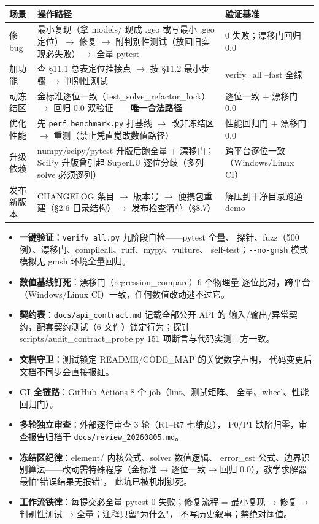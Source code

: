 \documentclass[12pt,a4paper]{ctexart}
\newcommand{\fem}{\Verb}
\begin{document}
\begin{longtable}{p{2.6cm}p{7.6cm}p{4.6cm}}
\toprule
\textbf{场景} & \textbf{操作路径} & \textbf{验证基准} \\
\midrule
修 bug & 最小复现（拿 models/ 现成 .geo 或写最小 .geo 定位）$\rightarrow$ 修复 $\rightarrow$ 附判别性测试（放回旧实现必失败）$\rightarrow$ 全量 pytest & 0 失败；漂移门回归 0.0 \\
加功能 & 查 §11.1 总表定位挂接点 $\rightarrow$ 按 §11.2 最小步骤 $\rightarrow$ 判别性测试 & verify\_all --fast 全绿 \\
动冻结区 & 金标准逐位一致（test\_solve\_refactor\_lock）$\rightarrow$ 回归 0.0 双验证——\textbf{唯一合法路径} & 逐位一致 + 漂移门 0.0 \\
优化性能 & 先 \fem|perf_benchmark.py| 打基线 $\rightarrow$ 改非冻结区 $\rightarrow$ 重测（禁止凭直觉改数值路径） & 性能回归门 + 漂移门 0.0 \\
升级依赖 & numpy/scipy/pytest 升版后跑全量 + 漂移门；SciPy 升版曾引起 SuperLU 逐位分歧（多列 solve 必须逐列） & 跨平台逐位一致（Windows/Linux CI） \\
发布新版本 & CHANGELOG 条目 $\rightarrow$ 版本号 $\rightarrow$ 便携包重建（§2.6 目录结构）$\rightarrow$ 发布检查清单（§8.7） & 解压到干净目录跑通 demo \\
\bottomrule
\end{longtable}
\normalsize

\begin{itemize}[leftmargin=*]
  \item \textbf{一键验证}：\fem|verify_all.py| 九阶段自检——pytest 全量、
        探针、fuzz（500 例）、漂移门、compileall、ruff、mypy、vulture、
        self-test；\fem|--no-gmsh| 模式模拟无 gmsh 环境全量回归。
  \item \textbf{数值基线钉死}：漂移门（regression\_compare）6 个物理量
        逐位比对，跨平台（Windows/Linux CI）一致，任何数值改动逃不过它。
  \item \textbf{契约表}：\fem|docs/api_contract.md| 记载全部公开 API 的
        输入/输出/异常契约，配套契约测试（6 文件）锁定行为；探针
        scripts/audit\_contract\_probe.py 151 项断言与代码实测三方一致。
  \item \textbf{文档守卫}：测试锁定 README/CODE\_MAP 的关键数字声明，
        代码变更后文档不同步会直接报红。
  \item \textbf{CI 全链路}：GitHub Actions 8 个 job（lint、测试矩阵、
        全量、wheel、性能回归门）。
  \item \textbf{多轮独立审查}：外部逐行审查 3 轮（R1--R7 七维度），
        P0/P1 缺陷归零，审查报告归档于 \fem|docs/review_20260805.md|。
  \item \textbf{冻结区纪律}：element/ 内核公式、solver 数值逻辑、
        error\_est 公式、边界识别算法——改动需特殊程序（金标准 →
        逐位一致 → 回归 0.0），教学求解器最怕"错误结果无报错"，
        此坑已被机制锁死。
  \item \textbf{工作流铁律}：每提交必全量 pytest 0 失败；修复流程 =
        最小复现 → 修复 → 判别性测试 → 全量；注释只留"为什么"，
        不写历史叙事；禁绝对阈值。
\end{itemize}
\end{document}
